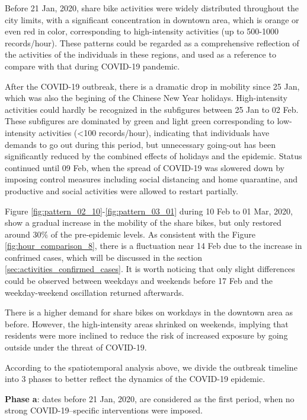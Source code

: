 \documentclass[preprints,article,accept,moreauthors,pdftex]{Definitions/mdpi}
\begin{document}
Before 21 Jan, 2020, share bike activities were widely distributed throughout the city limits, with a significant concentration in downtown area, which is orange or even red in color, corresponding to high-intensity activities (up to 500-1000 records/hour).
These patterns could be regarded as a comprehensive reflection of the activities of the individuals in these regions, and used as a reference to compare with that during COVID-19 pandemic.

After the COVID-19 outbreak, there is a dramatic drop in mobility since 25 Jan, which was also the begining of the Chinese New Year holidays.
High-intensity activities could hardly be recognized in the subfigures between 25 Jan to 02 Feb. 
These subfigures are dominated by green and light green corresponding to low-intensity activities (<100 records/hour), indicating that individuals have demands to go out during this period, but unnecessary going-out has been significantly reduced by the combined effects of holidays and the epidemic.
Status continued until 09 Feb, when the spread of COVID-19 was slowered down by imposing control measures including social distancing and home quarantine, and productive and social activities were allowed to restart partially.

Figure \ref{fig:pattern_02_10}-\ref{fig:pattern_03_01} during 10 Feb to 01 Mar, 2020, show a gradual increase in the mobility of the share bikes, but only restored around $30\%$ of the pre-epidemic levels.
As consistent with the Figure \ref{fig:hour_comparison_8}, there is a fluctuation near 14 Feb due to the increase in confrimed cases, which will be discussed in the section \ref{sec:activities_confirmed_cases}.
It is worth noticing that only slight differences could be observed between weekdays and weekends before 17 Feb and the weekday-weekend oscillation returned afterwards.

There is a higher demand for share bikes on workdays in the downtown area as before.
However, the high-intensity areas shrinked on weekends, implying that residents were more inclined to reduce the risk of increased exposure by going outside under the threat of COVID-19. 

According to the spatiotemporal analysis above, we divide the outbreak timeline into 3 phases to better reflect the dynamics of the COVID-19 epidemic.

\textbf{Phase a}: dates before 21 Jan, 2020, are considered as the first period, when no strong COVID-19–specific interventions were imposed.
\end{document}
